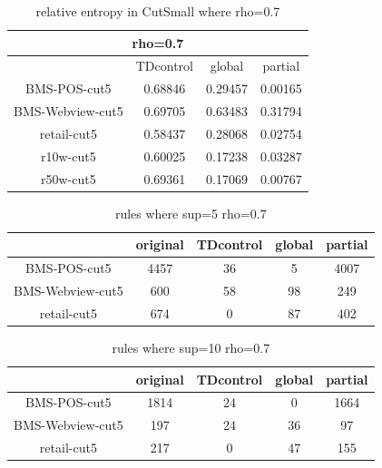 \documentclass{article}
\begin{document}
\begin{table}
\begin{tabular}{|c|c|c|c|}
  \hline
   \multicolumn{4}{|c|}{rho=0.7}\\
  \hline
  &TDcontrol & global & partial \\\hline
  BMS-POS-cut5 & 0.68846& 0.29457 & 0.00165 \\\hline
  BMS-Webview-cut5 &0.69705 &0.63483 &0.31794\\\hline
   retail-cut5 &0.58437 &0.28068&0.02754 \\\hline
  r10w-cut5 &0.60025& 0.17238& 0.03287 \\\hline
  r50w-cut5 & 0.69361 & 0.17069 & 0.00767 \\\hline
\end{tabular}
  \caption{ relative entropy in CutSmall where rho=0.7}
\end{table}




\begin{table}
\begin{tabular}{|c|c|c|c|c|}
  \hline
  & original & TDcontrol & global & partial \\\hline
  BMS-POS-cut5 & 4457 &36 & 5& 4007 \\\hline
  BMS-Webview-cut5 & 600& 58  &98 & 249 \\\hline
  retail-cut5 & 674 & 0& 87& 402 \\\hline
\end{tabular}
  \caption{ rules where sup=5 rho=0.7}
\end{table}


\begin{table}
\begin{tabular}{|c|c|c|c|c|}
  \hline
   & original &TDcontrol & global & partial \\ \hline
  BMS-POS-cut5 & 1814 &24  & 0& 1664 \\ \hline
  BMS-Webview-cut5 & 197&24  &36 & 97 \\ \hline
  retail-cut5 & 217 & 0& 47& 155\\
  \hline
\end{tabular}
\caption{ rules where sup=10 rho=0.7}
\end{table}
\end{document}
